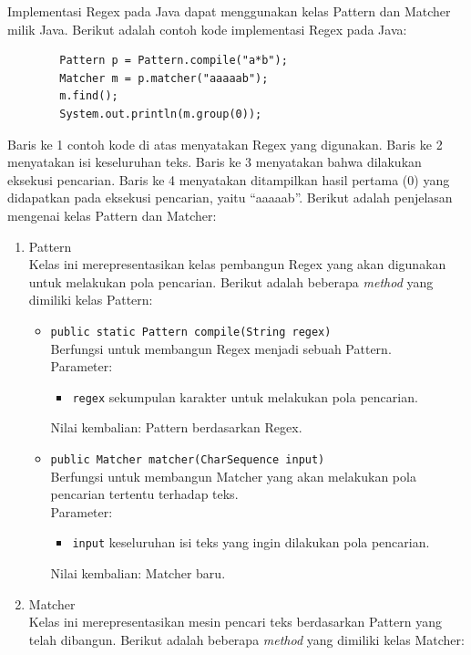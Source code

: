 Implementasi Regex pada Java dapat menggunakan kelas Pattern dan Matcher milik Java. Berikut adalah contoh kode implementasi Regex pada Java:

\begin{lstlisting}
		Pattern p = Pattern.compile("a*b");
 		Matcher m = p.matcher("aaaaab");
 		m.find();
 		System.out.println(m.group(0));
\end{lstlisting}

Baris ke 1 contoh kode di atas menyatakan Regex yang digunakan. Baris ke 2 menyatakan isi keseluruhan teks. Baris ke 3 menyatakan bahwa dilakukan eksekusi pencarian. Baris ke 4 menyatakan ditampilkan hasil pertama (0) yang didapatkan pada eksekusi pencarian, yaitu ``aaaaab''. Berikut adalah penjelasan mengenai kelas Pattern dan Matcher:
\begin{enumerate}
	\item Pattern\\
	Kelas ini merepresentasikan kelas pembangun Regex yang akan digunakan untuk melakukan pola pencarian. Berikut adalah beberapa \textit{method} yang dimiliki kelas Pattern:
	\begin{itemize}
		\item \texttt{public static Pattern compile(String regex)}\\
		Berfungsi untuk membangun Regex menjadi sebuah Pattern.\\
		Parameter:
		\begin{itemize}
			\item \texttt{regex} sekumpulan karakter untuk melakukan pola pencarian.
		\end{itemize}
		Nilai kembalian: Pattern berdasarkan Regex.
		\item \texttt{public Matcher matcher(CharSequence input)}\\
		Berfungsi untuk membangun Matcher yang akan melakukan pola pencarian tertentu terhadap teks.\\
		Parameter:
		\begin{itemize}
			\item \texttt{input} keseluruhan isi teks yang ingin dilakukan pola pencarian.
		\end{itemize}
		Nilai kembalian: Matcher baru.
	\end{itemize}
	\item Matcher\\
	Kelas ini merepresentasikan mesin pencari teks berdasarkan Pattern yang telah dibangun. Berikut adalah beberapa \textit{method} yang dimiliki kelas Matcher:
	\begin{itemize}

\end{itemize}
\end{enumerate}
